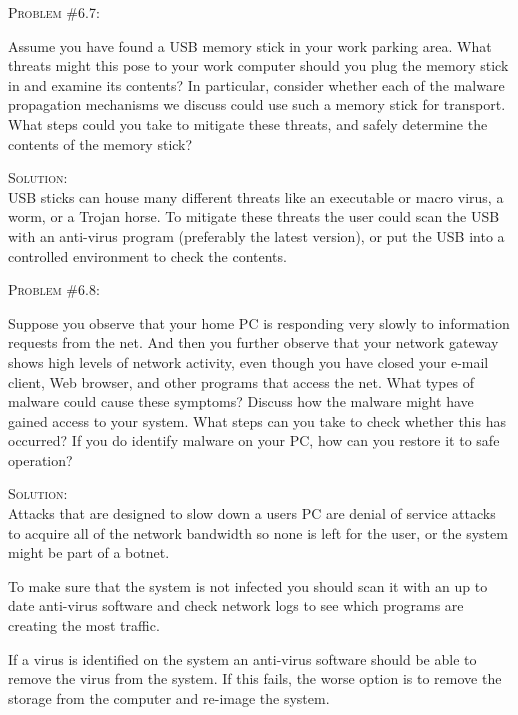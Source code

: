 \documentclass[12pt]{article}
\newenvironment{problem}[1]
{\begin{mdframed}[linewidth=0.8pt]
        \textsc{Problem #1:}

}
    {\end{mdframed}}
\newenvironment{solution}
    {\textsc{Solution:}\\}
    {\newpage}%
\begin{document}
	\begin{problem}{\#6.7}
		Assume you have found a USB memory stick in your work parking area. What threats might this pose to your work computer should you plug the memory stick in and examine its contents? In particular, consider whether each of the malware propagation mechanisms we discuss could use such a memory stick for transport. What steps could you take to mitigate these threats, and safely determine the contents of the memory stick?
	\end{problem}
	\begin{solution}
		USB sticks can house many different threats like an executable or macro virus, a worm, or a Trojan horse. To mitigate these threats the user could scan the USB with an anti-virus program (preferably the latest version), or put the USB into a controlled environment to check the contents.
	\end{solution}

	\begin{problem}{\#6.8}
		Suppose you observe that your home PC is responding very slowly to information requests from the net. And then you further observe that your network gateway shows high levels of network activity, even though you have closed your e-mail client, Web browser, and other programs that access the net. What types of malware could cause these symptoms? Discuss how the malware might have gained access to your system. What steps can you take to check whether this has occurred? If you do identify malware on your PC, how can you restore it to safe operation? 
	\end{problem}
	\begin{solution}
		Attacks that are designed to slow down a users PC are denial of service attacks to acquire all of the network bandwidth so none is left for the user, or the system might be part of a botnet.

		To make sure that the system is not infected you should scan it with an up to date anti-virus software and check network logs to see which programs are creating the most traffic.

		If a virus is identified on the system an anti-virus software should be able to remove the virus from the system. If this fails, the worse option is to remove the storage from the computer and re-image the system.
	\end{solution}
\end{document}
